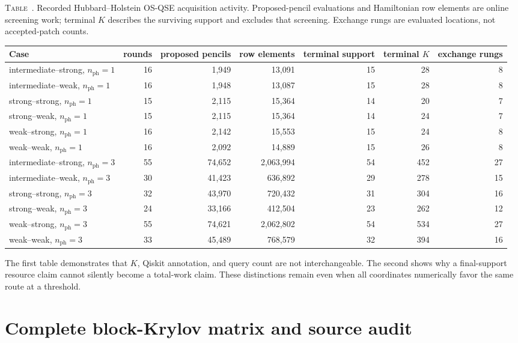 \documentclass[
  reprint,
  amsmath,
  amssymb,
  aps,
  pra,
  nofootinbib,
  superscriptaddress,
  floatfix
]{revtex4-2}
\newcommand{\nph}{n_{\mathrm{ph}}}
\newcommand{\inlinetablecaption}[2]{%
  \refstepcounter{table}\label{#1}%
  \noindent\textsc{Table~\thetable.} #2\par\vspace{0.6ex}%
}
\begin{document}
\begin{widetext}
\inlinetablecaption{tab:screening_work}{Recorded Hubbard--Holstein OS-QSE
acquisition activity.  Proposed-pencil evaluations and Hamiltonian row
elements are online screening work; terminal $K$ describes the surviving
support and excludes that screening.  Exchange rungs are evaluated locations,
not accepted-patch counts.}
\begin{center}
\scriptsize
\begin{tabular*}{\textwidth}{@{\extracolsep{\fill}}lrrrrrr@{}}
\toprule
Case & rounds & proposed pencils & row elements & terminal support & terminal $K$ & exchange rungs \\
\midrule
intermediate--strong, $\nph=1$ & 16 & 1,949 & 13,091 & 15 & 28 & 8 \\
intermediate--weak, $\nph=1$ & 16 & 1,948 & 13,087 & 15 & 28 & 8 \\
strong--strong, $\nph=1$ & 15 & 2,115 & 15,364 & 14 & 20 & 7 \\
strong--weak, $\nph=1$ & 15 & 2,115 & 15,364 & 14 & 24 & 7 \\
weak--strong, $\nph=1$ & 16 & 2,142 & 15,553 & 15 & 24 & 8 \\
weak--weak, $\nph=1$ & 16 & 2,092 & 14,889 & 15 & 26 & 8 \\
intermediate--strong, $\nph=3$ & 55 & 74,652 & 2,063,994 & 54 & 452 & 27 \\
intermediate--weak, $\nph=3$ & 30 & 41,423 & 636,892 & 29 & 278 & 15 \\
strong--strong, $\nph=3$ & 32 & 43,970 & 720,432 & 31 & 304 & 16 \\
strong--weak, $\nph=3$ & 24 & 33,166 & 412,504 & 23 & 262 & 12 \\
weak--strong, $\nph=3$ & 55 & 74,621 & 2,062,802 & 54 & 534 & 27 \\
weak--weak, $\nph=3$ & 33 & 45,489 & 768,579 & 32 & 394 & 16 \\
\bottomrule
\end{tabular*}
\end{center}
\end{widetext}

The first table demonstrates that $K$, Qiskit annotation, and query count are
not interchangeable.  The second shows why a final-support resource claim
cannot silently become a total-work claim.  These distinctions remain even
when all coordinates numerically favor the same route at a threshold.

\section{Complete block-Krylov matrix and source audit}
\label{app:block_krylov}
\end{document}
